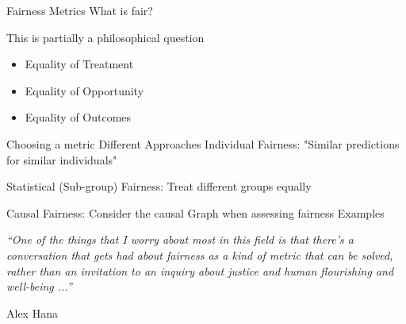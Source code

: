 \begin{vbframe}{Fairness Metrics}
What is fair?

This is partially a philosophical question

\begin{itemize}
\item Equality of Treatment
\item Equality of Opportunity
\item Equality of Outcomes 
\end{itemize}

\framebreak
Choosing a metric
Different Approaches
Individual Fairness: 
"Similar predictions for similar individuals" 


Statistical (Sub-group) Fairness:
Treat different groups equally


Causal Fairness:
Consider the causal Graph when assessing fairness
\framebreak
Examples


\framebreak 
\null
\vfill
\begin{large}
\textit{\enquote{One of the things that I worry about most in this field is that there’s a conversation that gets had about fairness as a kind of metric that can be solved, rather than an invitation to an inquiry about justice and human flourishing and well-being ...}}\\
\end{large}
Alex Hana
\vfill



\end{vbframe}
